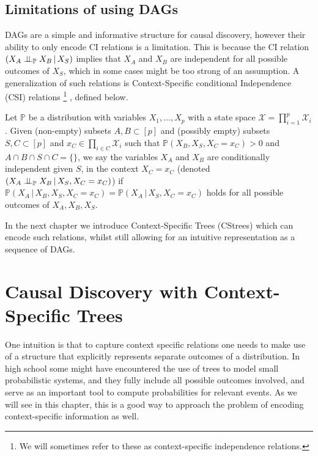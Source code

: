 \documentclass{tufte-book}
\begin{document}
\section{Limitations of using DAGs}
\label{sec:org5cbc505}
DAGs are a simple and informative structure for causal discovery, however their ability to only encode CI relations is a limitation. This is because the CI relation  \((X_A \perp \!\!\! \perp_{\mathbb{P}} X_B \,|\, X_S)\) implies that \(X_A\) and \(X_B\) are independent for all possible outcomes of \(X_S\), which in some cases might be too strong of an assumption. A generalization of such relations is Context-Specific conditional Independence (CSI) relations  \footnote{We will sometimes refer to these as context-specific independence relations.} , defined below.
\begin{definition}\label{def:csirel}
Let  $\mathbb{P}$ be a distribution with variables $X_1,...,X_p$ with a state space $\mathcal{X} = \prod_{i=1}^p \mathcal{X}_i$. Given (non-empty) subsets $A,B \subset [p]$ and (possibly empty) subsets $S,C \subset [p]$ and $x_C \in \prod_{i \in C}\mathcal{X}_i $ such that $\mathbb{P}(X_B, X_S, X_C = x_C)>0$ and $A \cap B \cap S \cap C = \{\}$, we say the variables $X_A$ and $X_B$ are conditionally independent given $S$, in the context $X_C=x_C$ (denoted $(X_A\perp \!\!\! \perp_{\mathbb{P}} X_B \,|\, X_S, X_C=x_C)$) if $\mathbb{P}(X_A \,|\,X_B, X_S,X_C=x_C) = \mathbb{P}(X_A \, |\, X_S,X_C=x_C)$ holds for all possible outcomes of $X_A,X_B,X_S$.
\end{definition}


In the next chapter we introduce Context-Specific Trees (CStrees) which can encode such relations, whilst still allowing for an intuitive representation as a sequence of DAGs.


 \newpage 

\chapter{Causal Discovery with Context-Specific Trees}
\label{sec:org288504d}
One intuition is that to capture context specific relations one needs to make use of a structure that explicitly represents separate outcomes of a distribution. In high school some might have encountered the use of trees to model small probabilistic systems, and they fully include all possible outcomes involved, and serve as an important tool to compute probabilities for relevant events. As we will see in this chapter, this is a good way to approach the problem of encoding context-specific information as well.
\end{document}
